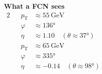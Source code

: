 \documentclass[14pt, t]{beamer}
\begin{document}
\begin{frame}
{\begin{columns}
        {\centering \textbf{What a FCN sees}}
        \vspace{3mm}
        \begin{alignat*}{2}
            && p_{\text{T}} & \approx \SI{55}{\giga \electronvolt}\\
            && \varphi & \approx \ang{136} \\
            && \eta & \approx 1.10 \quad (\theta \approx \ang{37}) \\[16mm]
            && p_{\text{T}} & \approx \SI{65}{\giga \electronvolt}\\
            && \varphi & \approx \ang{335} \\
            && \eta & \approx -0.14 \quad (\theta \approx \ang{98})
        \end{alignat*} 
    \end{columns}}

\end{frame}
\end{document}
